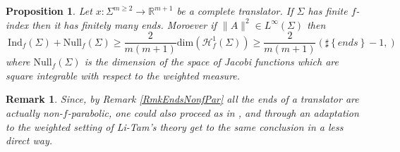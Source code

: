 \documentclass[11pt, leqno]{amsart}
\newtheorem{proposition}[theorem]{Proposition}
\newtheorem{remark}[theorem]{Remark}
\begin{document}
\begin{proposition}
Let $x:\Sigma^{m\geq 2}\to\mathbb{R}^{m+1}$ be a complete translator. If $\Sigma$ has finite $f$-index then it has finitely many ends. Moroever if $\|A\|^2\in L^{\infty}(\Sigma)$ then
\[
\ \mathrm{Ind}_{f}(\Sigma)+\mathrm{Null}_{f}(\Sigma)\geq \frac{2}{m(m+1)}\mathrm{dim}(\mathcal{H}^{1}_{f}(\Sigma))\geq \frac{2}{m(m+1)}(\sharp\left\{ends\right\}-1,)
\]
where $\mathrm{Null}_{f}(\Sigma)$ is the dimension of the space of Jacobi functions which are square integrable with respect to the weighted measure.
\end{proposition}


\begin{remark}
\rm{Since, by Remark \ref{RmkEndsNonfPar} all the ends of a translator are actually non-$f$-parabolic, one could also proceed as in \cite{ImperaRimoldi_Transl}, and through an adaptation to the weighted setting of Li-Tam's theory get to the same conclusion in a less direct way.}
\end{remark}



\bigskip



 
\end{document}
